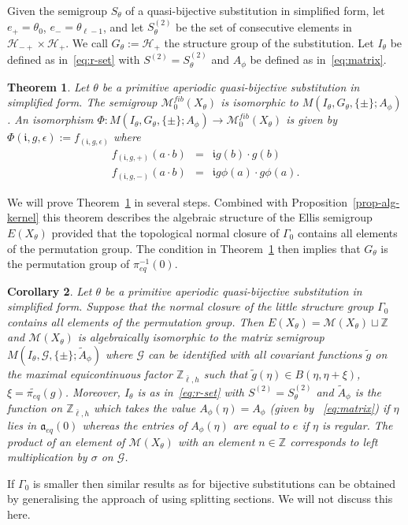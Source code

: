 \documentclass[12pt]{amsart}
\newtheorem{theorem}{Theorem}[section]
\newtheorem{cor}[theorem]{Corollary}
\theoremstyle{definition}
\numberwithin{equation}{section}
\newcommand{\Z}{\mathbb Z}
\newcommand{\tcb}{\textcolor{blue}}
\newcommand{\ii}{{\mathfrak i}}
\newcommand{\Gg}{{\mathcal G}}
\newcommand{\Hh}{{\mathcal H}}
\newcommand{\aut}{{\mathfrak a}}
\newcommand{\aute}{\aut_{eq}}
\newcommand{\pe}{\pi_{eq}}
\newcommand{\tpe}{\widetilde{\pe}}
\newcommand{\M}{\mathcal M}
\newcommand{\Sfib}{\M^{fib}_0(X_\theta)}
\begin{document}


Given the semigroup $S_\theta$ of a quasi-bijective substitution in simplified form, let $e_+=\theta_0$, $e_-=\theta_{\ell-1}$, and let $S^{(2)}_\theta$ be the set of consecutive elements in $\Hh_{-+}\times \Hh_{+}$. 
We call $G_\theta:= \Hh_{+}$ the structure group of the substitution. Let $I_\theta$ be defined as in~\eqref{eq:r-set} with $S^{(2)}=S^{(2)}_\theta$ and $A_\phi$ be defined as in~\eqref{eq:matrix}.
\begin{theorem}\label{thm-RMG}
Let $\theta$ be a primitive aperiodic quasi-bijective substitution in simplified form. The semigroup $\Sfib$ is isomorphic to $M(I_\theta,G_\theta,\{\pm\};A_\phi)$. An isomorphism $\Phi:M(I_\theta,G_\theta,\{\pm\};A_\phi)\to \Sfib$ is given by $\Phi(\ii ,g,\epsilon):= f_{(\ii ,g,\epsilon)}$  where 
\begin{eqnarray*} f_{(\ii ,g,+)}( a\cdot b) &=&\ii g (b)\cdot g(b)\\
f_{(\ii ,g,-)}(a\cdot b) &=& \ii g\phi(a)\cdot  g\phi (a).
\end{eqnarray*} 
\end{theorem}
We will prove Theorem~\ref{thm-RMG} in several steps.
Combined with Proposition~\ref{prop-alg-kernel} this theorem describes the 
algebraic structure of the Ellis semigroup $E(X_\theta)$ provided that the topological normal closure of $\Gamma_0$ contains all elements of the permutation group. 
The condition in Theorem~\ref{thm-RMG} then implies that $G_\theta$ is the permutation group of $\pe^{-1}(0)$.
\begin{cor}\label{cor-main-qbij}
Let $\theta$ be a primitive aperiodic quasi-bijective substitution in simplified form. Suppose that the normal closure of the little structure group $\Gamma_0$ contains all elements of the permutation group. 
Then $E(X_\theta) = \M(X_\theta) \sqcup \Z$ and $\M(X_\theta)$ is algebraically isomorphic to the matrix semigroup 
$M(I_\theta,\Gg,\{\pm\};\tilde A_\phi)$
where $\Gg$ can be identified with all covariant functions $\tilde g$ on the maximal equicontinuous factor $\Z_{\bar{\ell},h}$ such that $ \tilde g(\eta) \in B(\eta,\eta+\xi)$, $\xi = \tpe(g)$. Moreover, $I_\theta$ is as in~\eqref{eq:r-set} with $S^{(2)}=S^{(2)}_\theta$ and $\tilde A_\phi$ is the function on $\Z_{\bar{\ell},h}$ which takes the value $A_\phi(\eta) = A_\phi$ (given by ~\eqref{eq:matrix})
if $\eta$ lies in $\aute(0)$ whereas the entries of $A_\phi(\eta)$ are equal to $e$ if  $\eta$ is regular. The product of an element of $\M(X_\theta)$ with an element $n\in \Z$ corresponds to left multiplication by $\sigma$ on $\Gg$.
\end{cor}
If $\Gamma_0$ is smaller then similar results as for bijective substitutions can be obtained by generalising the approach of \cite{ESBS} using splitting sections. We will not discuss this here. 
\end{document}
